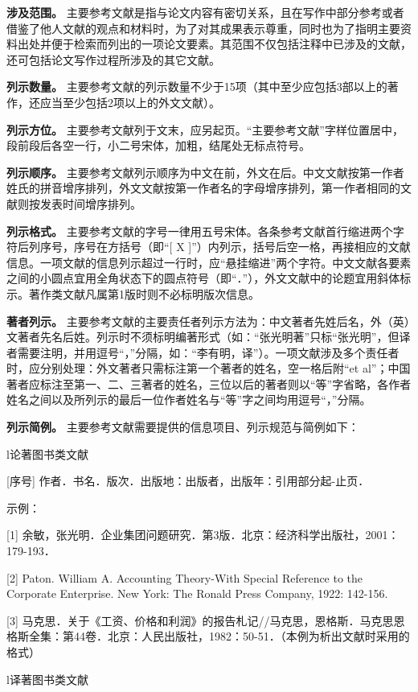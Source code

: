\documentclass[doublesided]{Style/ucasthesis}%
\begin{document}
\textbf{涉及范围。} 主要参考文献是指与论文内容有密切关系，且在写作中部分参考或者借鉴了他人文献的观点和材料时，为了对其成果表示尊重，同时也为了指明主要资料出处并便于检索而列出的一项论文要素。其范围不仅包括注释中已涉及的文献，还可包括论文写作过程所涉及的其它文献。

\textbf{列示数量。} 主要参考文献的列示数量不少于15项（其中至少应包括3部以上的著作，还应当至少包括2项以上的外文文献）。

\textbf{列示方位。} 主要参考文献列于文末，应另起页。``主要参考文献''字样位置居中，段前段后各空一行，小二号宋体，加粗，结尾处无标点符号。

\textbf{列示顺序。} 主要参考文献列示顺序为中文在前，外文在后。中文文献按第一作者姓氏的拼音增序排列，外文文献按第一作者名的字母增序排列，第一作者相同的文献则按发表时间增序排列。

\textbf{列示格式。} 主要参考文献的字号一律用五号宋体。各条参考文献首行缩进两个字符后列序号，序号在方括号（即``{[} X {]}''）内列示，括号后空一格，再接相应的文献信息。一项文献的信息列示超过一行时，应``悬挂缩进''两个字符。中文文献各要素之间的小圆点宜用全角状态下的圆点符号（即``．''），外文文献中的论题宜用斜体标示。著作类文献凡属第1版时则不必标明版次信息。

\textbf{著者列示。} 主要参考文献的主要责任者列示方法为：中文著者先姓后名，外（英）文著者先名后姓。列示时不须标明编著形式（如：``张光明著''只标``张光明''，但译者需要注明，并用逗号``，''分隔，如：``李有明，译''）。一项文献涉及多个责任者时，应分别处理：外文著者只需标注第一个著者的姓名，空一格后附``et al''；中国著者应标注至第一、二、三著者的姓名，三位以后的著者则以``等''字省略，各作者姓名之间以及所列示的最后一位作者姓名与``等''字之间均用逗号``，''分隔。

\textbf{列示简例。} 主要参考文献需要提供的信息项目、列示规范与简例如下：

l论著图书类文献

{[}序号{]} 作者．书名．版次．出版地：出版者，出版年：引用部分起-止页．

示例：

{[}1{]} 余敏，张光明．企业集团问题研究．第3版．北京：经济科学出版社，2001：179-193．

{[}2{]} Paton. William A. Accounting Theory-With Special Reference to the Corporate Enterprise. New York: The Ronald Press Company, 1922: 142-156.

{[}3{]} 马克思．关于《工资、价格和利润》的报告札记//马克思，恩格斯．马克思恩格斯全集：第44卷．北京：人民出版社，1982：50-51．（本例为析出文献时采用的格式）

l译著图书类文献
\end{document}
